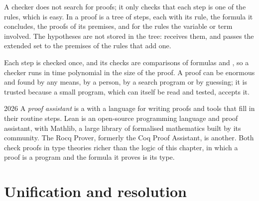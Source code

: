 A checker does not search for proofs; it only checks that each step is one of the rules, which is easy. In
 a proof is a tree of steps, each with its rule, the formula it concludes, the proofs of its premises,
and for the  rules the variable or term involved. The hypotheses are not stored in the tree:
 receives them, and passes the extended set to the premises of the rules that add one.

\label{lst:b2:predicate-logic:checker}

\label{lst:b2:predicate-logic:proofs}

\label{out:b2:predicate-logic:check-demo}

Each step is checked once, and its checks are comparisons of formulas and , so a checker runs in time
polynomial in the size of the proof. A proof can be enormous and found by any means, by a person, by a search program
or by guessing; it is trusted because a small program, which can itself be read and tested, accepts it.

\begin{dated}{2026}
A \emph{proof assistant} is a  with a language for writing proofs and tools that fill in their routine
steps. Lean is an open-source programming language and proof assistant, with Mathlib, a large library of formalised
mathematics built by its community. The Rocq Prover, formerly the Coq Proof Assistant, is another. Both check proofs in
type theories richer than the logic of this chapter, in which a proof is a program and the formula it proves is its
type.
\end{dated}

\section{Unification and resolution}\label{sec:b2:predicate-logic:resolution}

